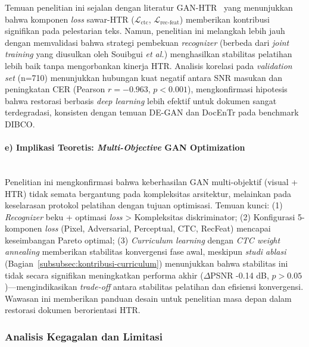 \documentclass[12pt,a4paper]{article}
\begin{document}
Temuan penelitian ini sejalan dengan literatur GAN-HTR~\cite{souibgui2021enhance,kang2021pay} yang menunjukkan bahwa komponen \textit{loss} sawar-HTR ($\mathcal{L}_{\text{ctc}}$, $\mathcal{L}_{\text{rec-feat}}$) memberikan kontribusi signifikan pada pelestarian teks. Namun, penelitian ini melangkah lebih jauh dengan memvalidasi bahwa strategi pembekuan \textit{recognizer} (berbeda dari \textit{joint training} yang diusulkan oleh Souibgui \textit{et al.}) menghasilkan stabilitas pelatihan lebih baik tanpa mengorbankan kinerja HTR. Analisis korelasi pada \textit{validation set} (n=710) menunjukkan hubungan kuat negatif antara SNR masukan dan peningkatan CER (Pearson $r = -0.963$, $p<0.001$), mengkonfirmasi hipotesis bahwa restorasi berbasis \textit{deep learning} lebih efektif untuk dokumen sangat terdegradasi, konsisten dengan temuan DE-GAN dan DocEnTr pada benchmark DIBCO.

\paragraph{e) Implikasi Teoretis: \textit{Multi-Objective} GAN Optimization}\mbox{}\\[0.1em]

Penelitian ini mengkonfirmasi bahwa keberhasilan GAN multi-objektif (visual + HTR) tidak semata bergantung pada kompleksitas arsitektur, melainkan pada keselarasan protokol pelatihan dengan tujuan optimisasi. Temuan kunci: (1) \textit{Recognizer} beku + optimasi \textit{loss} > Kompleksitas diskriminator; (2) Konfigurasi 5-komponen \textit{loss} (Pixel, Adversarial, Perceptual, CTC, RecFeat) mencapai keseimbangan Pareto optimal; (3) \textit{Curriculum learning} dengan \textit{CTC weight annealing} memberikan stabilitas konvergensi fase awal, meskipun \textit{studi ablasi} (Bagian~\ref{subsubsec:kontribusi-curriculum}) menunjukkan bahwa stabilitas ini tidak secara signifikan meningkatkan performa akhir ($\Delta$PSNR -0.14 dB, $p>0.05$)—mengindikasikan \textit{trade-off} antara stabilitas pelatihan dan efisiensi konvergensi. Wawasan ini memberikan panduan desain untuk penelitian masa depan dalam restorasi dokumen berorientasi HTR.

\vspace{0.8em}

\subsubsection{Analisis Kegagalan dan Limitasi}
\label{subsubsec:analisis-kegagalan}
\end{document}
